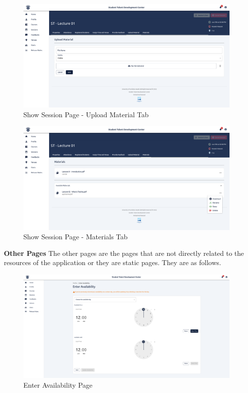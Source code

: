 \begin{justify}
    \begin{figure}[H]
        \centerline{\includegraphics[width=150mm,scale=1]{figures/implementation_and_testing/implementation/frontend/pages/Sessions - Upload Materials.png}}
        \caption{Show Session Page - Upload Material Tab}
    \end{figure}

    \begin{figure}[H]
        \centerline{\includegraphics[width=150mm,scale=1]{figures/implementation_and_testing/implementation/frontend/pages/Sessions Materials.png}}
        \caption{Show Session Page - Materials Tab}
    \end{figure}


    \clearpage
    \noindent \textbf{Other Pages}\newendline
    The other pages are the pages that are not directly related to the resources of the application or they are static pages. They are as follows.

    \begin{figure}[H]
        \centerline{\includegraphics[width=150mm,scale=1]{figures/implementation_and_testing/implementation/frontend/pages/Enter Availability.png}}
        \caption{Enter Availability Page}
    \end{figure}


\end{justify}

